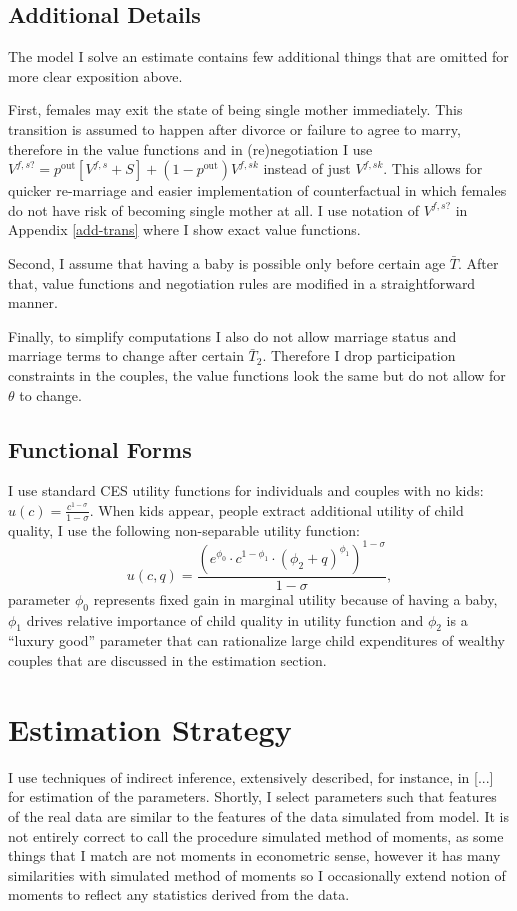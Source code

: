 \documentclass[12pt,letter]{article}
\begin{document}
\subsection{Additional Details}
The model I solve an estimate contains few additional things that are omitted for more clear exposition above.

First, females may exit the state of being single mother immediately. This transition is assumed to happen after divorce or failure to agree to marry, therefore in the value functions and in (re)negotiation I use $V^{f,s?} = p^{\text{out}} [V^{f,s} + S] + (1-p^{\text{out}})V^{f,sk}$ instead of just $V^{f,sk}$. This allows for quicker re-marriage and easier implementation of counterfactual in which females do not have risk of becoming single mother at all. I use notation of $V^{f,s?}$ in Appendix \ref{add-trans} where I show exact value functions.

Second, I assume that having a baby is possible only before certain age $\bar{T}$. After that, value functions and negotiation rules are modified in a straightforward manner.

Finally, to simplify computations I also do not allow marriage status and marriage terms to change after certain $\bar{T}_2$. Therefore I drop participation constraints in the couples, the value functions look the same but do not allow for $\theta$ to change.

\subsection{Functional Forms}
I use standard CES utility functions for individuals and couples with no kids: $u(c) = \frac{c^{1-\sigma}}{1-\sigma}$.  When kids appear, people extract additional utility of child quality, I use the following non-separable utility function:
\[u(c,q) = \frac{\left(e^{\phi_0}\cdot c^{1-\phi_1} \cdot (\phi_2 + q)^{\phi_1}\right)^{1-\sigma}}{1-\sigma},\]
parameter $\phi_0$ represents fixed gain in marginal utility because of having a baby, $\phi_1$ drives relative importance of child quality in utility function and $\phi_2$ is a ``luxury good'' parameter that can rationalize large child expenditures of wealthy couples that are discussed in the estimation section.

\section{Estimation Strategy}
I use techniques of indirect inference, extensively described, for instance, in [...] for estimation of the parameters. Shortly, I select parameters such that features of the real data are similar to the features of the data simulated from model. It is not entirely correct to call the procedure simulated method of moments, as some things that I match are not moments in econometric sense, however it has many similarities with simulated method of moments so I occasionally extend notion of moments to reflect any statistics derived from the data.
\end{document}
